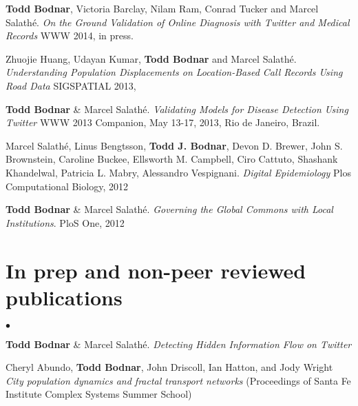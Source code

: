 \documentclass[margin,line]{res}
\newcommand{\linkToUrl}[1]{{\color{blue}\underline{\href{#1}{Link}}}}
\renewcommand{\linkToUrl}[1]{}
\newenvironment{list2}{
  \begin{list}{$\bullet$}{%
      \setlength{\itemsep}{0in}
      \setlength{\parsep}{0in} \setlength{\parskip}{0in}
      \setlength{\topsep}{0in} \setlength{\partopsep}{0in} 
      \setlength{\leftmargin}{10pt}}}{\end{list}}
\begin{document}
\begin{resume}
\begin{etaremune}[start=5,leftmargin=13pt]
\item \textbf{Todd Bodnar}, Victoria Barclay, Nilam Ram, Conrad Tucker and Marcel Salath\'e. \textit{On the Ground Validation of Online Diagnosis with Twitter and Medical Records} WWW 2014, in press.

\item Zhuojie Huang, Udayan Kumar, \textbf{Todd Bodnar} and Marcel Salath\'e. \textit{Understanding Population Displacements on Location-Based Call Records Using Road Data} SIGSPATIAL 2013, \linkToUrl{http://bit.ly/1dAjC5o}

\item \textbf{Todd Bodnar} \& Marcel Salath\'e. \textit{Validating Models for Disease Detection Using Twitter}  WWW 2013 Companion, May 13-17, 2013, Rio de Janeiro, Brazil. \linkToUrl{http://bit.ly/WWL1Gr}

\item Marcel Salath\'e, Linus Bengtsson, \textbf{Todd J. Bodnar}, Devon D. Brewer, John S. Brownstein, Caroline Buckee, Ellsworth M. Campbell, Ciro Cattuto, Shashank Khandelwal, Patricia L. Mabry,  Alessandro Vespignani. \textit{Digital Epidemiology} Plos Computational Biology, 2012 \linkToUrl{http://bitly.com/PO2fSx}

\item \textbf{Todd Bodnar} \& Marcel Salath\'e. \textit{Governing the Global Commons with Local Institutions}. PloS One, 2012 \linkToUrl{http://bit.ly/TtsZd5}
\end{etaremune}

\section{\sc In prep and non-peer reviewed publications}

\begin{list2}
\item \textbf{Todd Bodnar} \& Marcel Salath\'e. \textit{Detecting Hidden Information Flow on Twitter} %
\item Cheryl Abundo, \textbf{Todd Bodnar}, John Driscoll, Ian Hatton, and Jody Wright
 \textit{City population dynamics and fractal transport networks} (Proceedings of Santa Fe Institute Complex Systems Summer School) \linkToUrl{bit.ly/19A22vY}%
\end{list2}


\end{resume}
\end{document}
